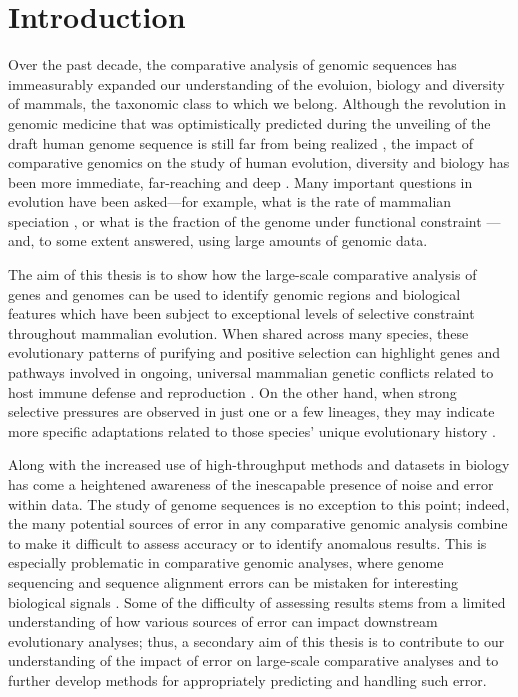 \chapter{Introduction}
\label{ch_intro}

Over the past decade, the comparative analysis of genomic sequences
has immeasurably expanded our understanding of the evoluion, biology
and diversity of mammals, the taxonomic class to which we belong.
Although the revolution in genomic
medicine that was optimistically predicted during the unveiling of the
draft human genome sequence is still far from being realized
\citep{Collins2001,Varmus2010}, the impact of comparative genomics on
the study of human evolution, diversity and biology has been more
immediate, far-reaching and deep \citep{OBrien1999,Lander2011}. Many
important questions in evolution have been asked---for example, what
is the rate of mammalian speciation
\citep{BinindaEmonds2007,Venditti2011}, or what is the fraction of the
genome under functional constraint
\citep{Boffelli2003a,Siepel2005,Ponting2011}---and, to some extent
answered, using large amounts of genomic data.

The aim of this thesis is to show how the large-scale comparative
analysis of genes and genomes can be used to identify genomic regions
and biological features which have been subject to exceptional levels
of selective constraint throughout mammalian evolution. When shared
across many species, these evolutionary patterns of purifying and
positive selection can highlight genes and pathways involved in
ongoing, universal mammalian genetic conflicts related to host immune
defense and reproduction \citep{CastilloDavis2004}. On the other hand,
when strong selective pressures are observed in just one or a few
lineages, they may indicate more specific adaptations related to those
species' unique evolutionary history
\citep{Messier1997,Sawyer2005a,Nielsen2007}.

Along with the increased use of high-throughput methods and datasets
in biology has come a heightened awareness of the inescapable presence
of noise and error within data. The study of genome sequences is no
exception to this point; indeed, the many potential sources of error
in any comparative genomic analysis combine to make it difficult to
assess accuracy or to identify anomalous results. This is especially
problematic in comparative genomic analyses, where genome sequencing
and sequence alignment errors can be mistaken for interesting
biological signals
\citep{Mallick2009,Schneider2009,Fletcher2010,MarkovaRaina2011}. Some
of the difficulty of assessing results stems from a limited
understanding of how various sources of error can impact downstream
evolutionary analyses; thus, a secondary aim of this thesis is to
contribute to our understanding of the impact of error on large-scale
comparative analyses and to further develop methods for appropriately
predicting and handling such error.

